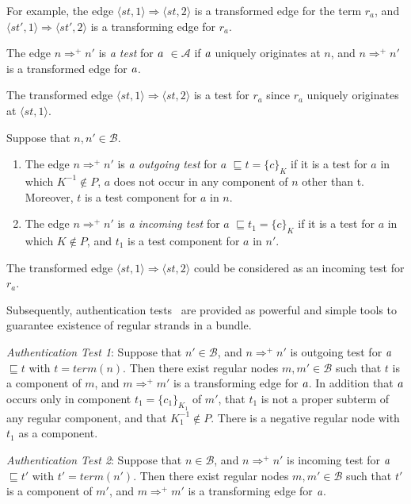  For example, the edge $\langle st,1\rangle \Rightarrow \langle st,2\rangle$ is a transformed edge for the term $r_a$, and  $\langle st',1\rangle \Rightarrow \langle st',2\rangle$ is a transforming edge for $r_a$. 

\begin{Definition} 
The edge $n \Rightarrow^+ n'$ is \emph{a test} for $\emph{a}$ $\in \mathcal{A}$ if $\emph{a}$ uniquely originates at $n$, and $n \Rightarrow^+ n'$ is a transformed edge for $\emph{a}$. 
\end{Definition}

The transformed edge $\langle st,1\rangle \Rightarrow \langle st,2\rangle$ is a test for $r_a$ since $r_a$ uniquely originates at $\langle st,1\rangle$. 

\begin{Definition} Suppose that $n, n' \in \mathcal{B}$.
\begin{enumerate}
\item The edge $n \Rightarrow^+ n'$ is \emph{a outgoing test} for $a$ $\sqsubseteq t = \{c\}_K$ if it is a test for $a$ in which $K^{-1} \not\in P$, $a$ does not occur in any component of $n$ other than t. Moreover, $t$ is a test component for $a$ in $n$.
\item The edge $n \Rightarrow^+ n'$ is \emph{a incoming test} for $a$ $\sqsubseteq t_1 = \{c\}_K$ if it is a test for $a$ in which $K \not\in P$, and $t_1$ is a test component for $a$ in $n'$.
\end{enumerate}
\end{Definition}

The transformed edge $\langle st,1\rangle \Rightarrow \langle st,2\rangle$ could be considered as an incoming test for $r_a$. 

Subsequently, authentication tests~\cite{authenticationtests} are provided as powerful and simple tools to guarantee existence of regular strands in a bundle. 

\emph{Authentication Test 1}: Suppose that $n' \in \mathcal{B}$, and $n \Rightarrow^+ n'$ is outgoing test for $\emph{a}$ $\sqsubseteq t$ with $t = term(n)$. Then there exist regular nodes $m,m' \in \mathcal{B}$ such that $t$ is a component of $m$, and  $m \Rightarrow^+m'$ is a transforming edge for $\emph{a}$. In addition that $\emph{a}$ occurs only in component $t_1=\{c_1\}_{K_1}$ of $m'$, that $t_1$ is not a proper subterm of any regular component, and that $K^{-1}_1 \not\in P$. There is a negative regular node with $t_1$ as a component. 


\emph{Authentication Test 2}: Suppose that $n \in \mathcal{B}$, and $n \Rightarrow^+ n'$ is incoming test for $\emph{a}$ $\sqsubseteq t'$ with $t' = term(n')$. Then there exist regular nodes $m,m' \in \mathcal{B}$ such that $t'$ is a component of $m'$, and  $m \Rightarrow^+m'$ is a transforming edge for $\emph{a}$. 

